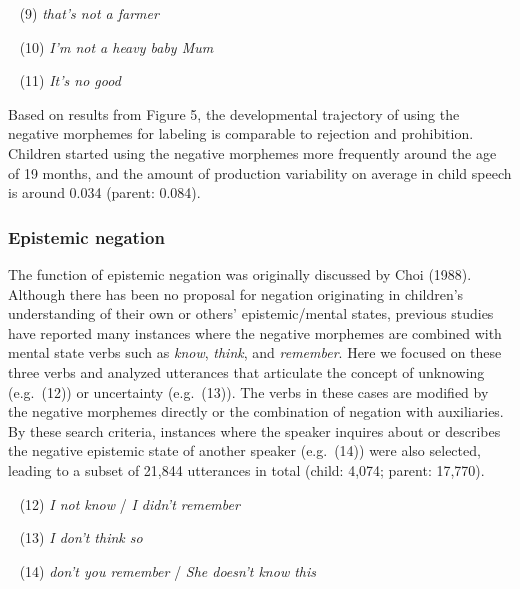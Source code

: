 \documentclass[10pt, letterpaper]{article}
\begin{document}
~ (9) \emph{that's not a farmer}

~ (10) \emph{I'm not a heavy baby Mum}

~ (11) \emph{It's no good}

Based on results from Figure 5, the developmental trajectory of using
the negative morphemes for labeling is comparable to rejection and
prohibition. Children started using the negative morphemes more
frequently around the age of 19 months, and the amount of production
variability on average in child speech is around 0.034 (parent: 0.084).

\hypertarget{epistemic-negation}{%
\subsubsection{Epistemic negation}\label{epistemic-negation}}

The function of epistemic negation was originally discussed by Choi
(1988). Although there has been no proposal for negation originating in
children's understanding of their own or others' epistemic/mental
states, previous studies have reported many instances where the negative
morphemes are combined with mental state verbs such as \emph{know},
\emph{think}, and \emph{remember}. Here we focused on these three verbs
and analyzed utterances that articulate the concept of unknowing
(e.g.~(12)) or uncertainty (e.g.~(13)). The verbs in these cases are
modified by the negative morphemes directly or the combination of
negation with auxiliaries. By these search criteria, instances where the
speaker inquires about or describes the negative epistemic state of
another speaker (e.g.~(14)) were also selected, leading to a subset of
21,844 utterances in total (child: 4,074; parent: 17,770).

~ (12) \emph{I not know} / \emph{I didn't remember}

~ (13) \emph{I don't think so}

~ (14) \emph{don't you remember} / \emph{She doesn't know this}
\end{document}
